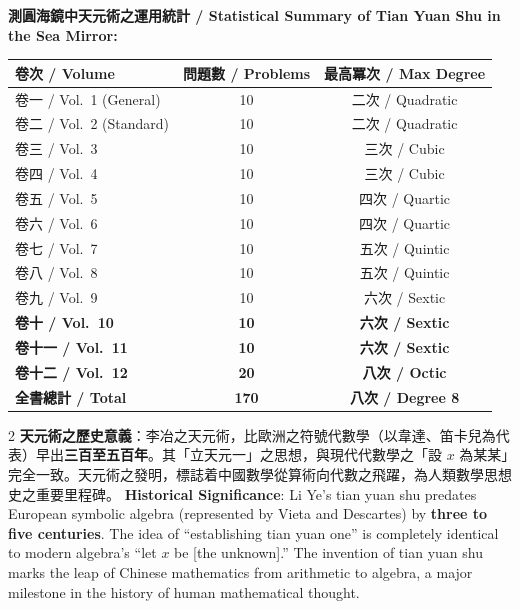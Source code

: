 \documentclass[11pt,a4paper]{article}
\begin{document}
\textbf{測圓海鏡中天元術之運用統計 / Statistical Summary of Tian Yuan Shu in the Sea Mirror:}
\begin{center}
\begin{tabular}{l|c|c}
\textbf{卷次 / Volume} & \textbf{問題數 / Problems} & \textbf{最高冪次 / Max Degree} \\
\hline
卷一 / Vol.\ 1 (General) & 10 & 二次 / Quadratic \\
卷二 / Vol.\ 2 (Standard) & 10 & 二次 / Quadratic \\
卷三 / Vol.\ 3 & 10 & 三次 / Cubic \\
卷四 / Vol.\ 4 & 10 & 三次 / Cubic \\
卷五 / Vol.\ 5 & 10 & 四次 / Quartic \\
卷六 / Vol.\ 6 & 10 & 四次 / Quartic \\
卷七 / Vol.\ 7 & 10 & 五次 / Quintic \\
卷八 / Vol.\ 8 & 10 & 五次 / Quintic \\
卷九 / Vol.\ 9 & 10 & 六次 / Sextic \\
\textbf{卷十 / Vol.\ 10} & \textbf{10} & \textbf{六次 / Sextic} \\
\textbf{卷十一 / Vol.\ 11} & \textbf{10} & \textbf{六次 / Sextic} \\
\textbf{卷十二 / Vol.\ 12} & \textbf{20} & \textbf{八次 / Octic} \\
\hline
\textbf{全書總計 / Total} & \textbf{170} & \textbf{八次 / Degree 8} \\
\hline
\end{tabular}
\end{center}

\vspace{0.5cm}

\begin{paracol}{2}
\textbf{天元術之歷史意義}：李冶之天元術，比歐洲之符號代數學（以韋達、笛卡兒為代表）早出\textbf{三百至五百年}。其「立天元一」之思想，與現代代數學之「設 $x$ 為某某」完全一致。天元術之發明，標誌着中國數學從算術向代數之飛躍，為人類數學思想史之重要里程碑。
\switchcolumn
\textbf{Historical Significance}: Li Ye's tian yuan shu predates European symbolic algebra (represented by Vieta and Descartes) by \textbf{three to five centuries}. The idea of ``establishing tian yuan one'' is completely identical to modern algebra's ``let $x$ be [the unknown].'' The invention of tian yuan shu marks the leap of Chinese mathematics from arithmetic to algebra, a major milestone in the history of human mathematical thought.
\end{paracol}
\end{document}
